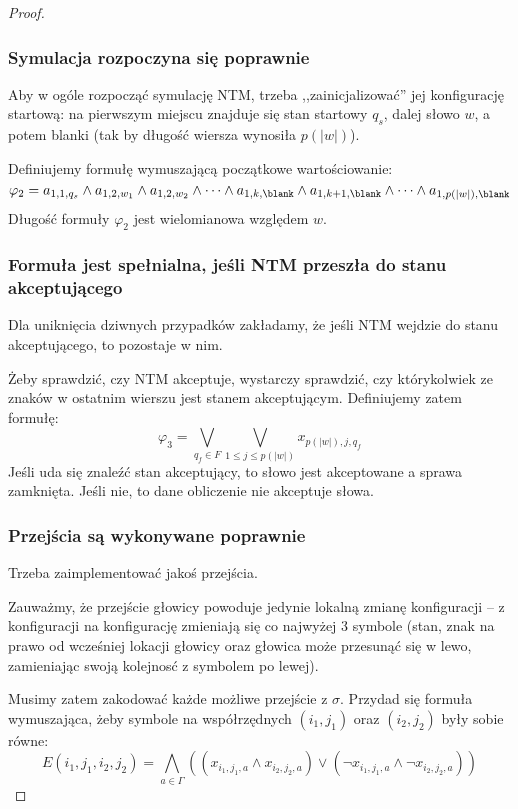 \begin{proof}
    \subsubsection{Symulacja rozpoczyna się poprawnie}
        Aby w ogóle rozpocząć symulację NTM, trzeba ,,zainicjalizować'' jej konfigurację startową: na pierwszym miejscu znajduje się stan startowy \(q_s\), dalej słowo \(w\), a potem blanki (tak by długość wiersza wynosiła \(p(|w|)\)). 
        
        Definiujemy formułę wymuszającą początkowe wartościowanie:
        \[
            \varphi_2 = a_{1,1, q_{s}} \land a_{1,2, w_1} \land a_{1,2, w_2} \land \dots \land a_{1, k, \blank} \land a_{1, k+1, \blank} \land \dots \land a_{1, p(|w|), \blank}
        \]
        Długość formuły \(\varphi_2\) jest wielomianowa względem \(w\). 
    
    \subsubsection{Formuła jest spełnialna, jeśli NTM przeszła do stanu akceptującego}
        Dla uniknięcia dziwnych przypadków zakładamy, że jeśli NTM wejdzie do stanu akceptującego, to pozostaje w nim.

        Żeby sprawdzić, czy NTM akceptuje, wystarczy sprawdzić, czy którykolwiek ze znaków w ostatnim wierszu jest stanem akceptującym. Definiujemy zatem formułę:
        \[ 
            \varphi_3 = \bigvee_{q_f \in F } \bigvee_{1 \leq j \leq p(|w|)} x_{p(|w|), j, q_f}
        \]
        Jeśli uda się znaleźć stan akceptujący, to słowo jest akceptowane a sprawa zamknięta. Jeśli nie, to dane obliczenie nie akceptuje słowa.
    
    \subsubsection{Przejścia są wykonywane poprawnie}
        Trzeba zaimplementować jakoś przejścia.
        
        Zauważmy, że przejście głowicy powoduje jedynie lokalną zmianę konfiguracji -- z konfiguracji na konfigurację zmieniają się co najwyżej 3 symbole (stan, znak na prawo od wcześniej lokacji głowicy oraz głowica może przesunąć się w lewo, zamieniając swoją kolejnosć z symbolem po lewej).

        Musimy zatem zakodować każde możliwe przejście z \( \sigma \). Przydad się formuła wymuszająca, żeby symbole na współrzędnych \( (i_1, j_1) \) oraz \((i_2, j_2)\) były sobie równe:
        \[ 
            E(i_1, j_1, i_2, j_2) = \bigwedge_{a \in \Gamma} ((x_{i_1, j_1, a} \land x_{i_2, j_2, a}) \lor (\neg x_{i_1, j_1, a} \land \neg x_{i_2, j_2, a}) )
        \]
        

\end{proof}
